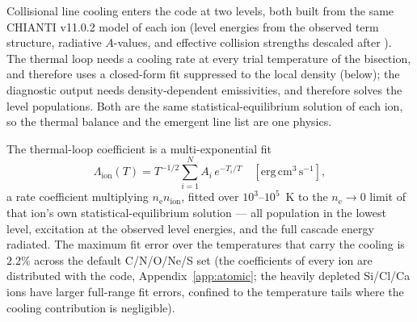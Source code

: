 \documentclass[twocolumn,linenumbers]{aastex702}
\newcommand{\nelec}{n_{\mathrm{e}}}
\begin{document}
Collisional line cooling enters the code at two levels, both built from the
same CHIANTI v11.0.2 model of each ion (level energies from the observed
term structure, radiative $A$-values, and effective collision strengths
descaled after \citealt{burgess1992}).  The thermal loop needs a cooling
rate at every trial temperature of the bisection, and therefore uses a
closed-form fit suppressed to the local density (below); the diagnostic
output needs density-dependent emissivities, and therefore solves the level
populations.  Both are the same statistical-equilibrium solution of each
ion, so the thermal balance and the emergent line list are one physics.

The thermal-loop coefficient is a multi-exponential fit
\begin{equation}
  \Lambda_{\mathrm{ion}}(T) = T^{-1/2}\sum_{i=1}^{N} A_i\,e^{-T_i/T}
  \quad [\mathrm{erg\,cm^3\,s^{-1}}],
  \label{eq:cool}
\end{equation}%
a rate coefficient multiplying $\nelec n_{\mathrm{ion}}$, fitted over
$10^3$--$10^5$~K to the $\nelec \to 0$ limit of that ion's own
statistical-equilibrium solution --- all population in the lowest level,
excitation at the observed level energies, and the full cascade energy
radiated.  The maximum fit error over the temperatures that carry the
cooling is $2.2\%$ across the default C/N/O/Ne/S set (the coefficients of
every ion are distributed with the code, Appendix~\ref{app:atomic}; the
heavily depleted Si/Cl/Ca ions have larger full-range fit errors, confined
to the temperature tails where the cooling contribution is negligible).
\end{document}
